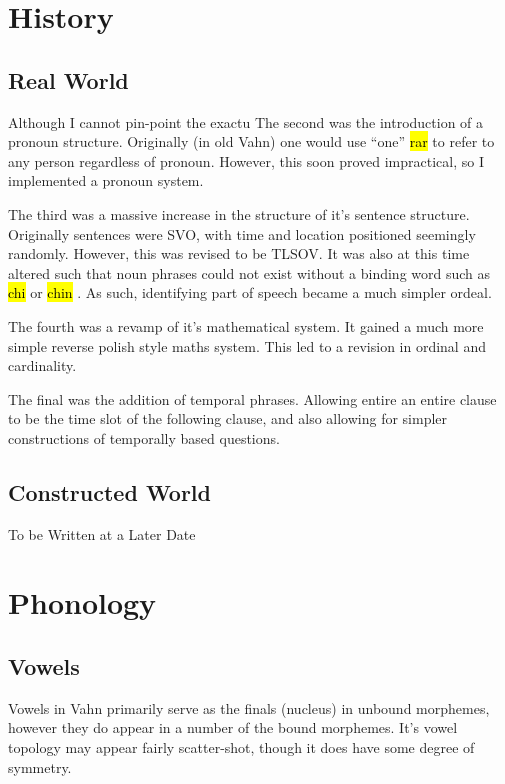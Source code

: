 \documentclass{article}
\newcommand{\hlv}[2][gray]{ {\sethlcolor{#1} \hl{#2}} }
\begin{document}
\newpage
\section{History}

\subsection{Real World}

Although I cannot pin-point the exactu
The second was the introduction of a pronoun structure. Originally (in old Vahn) one would use ``one'' \hlv{rar} to refer to any person regardless of pronoun. However, this soon proved impractical, so I implemented a pronoun system.

The third was a massive increase in the structure of it's sentence structure. Originally sentences were SVO, with time and location positioned seemingly randomly. However, this was revised to be TLSOV. It was also at this time altered such that noun phrases could not exist without a binding word such as \hlv{chi} or \hlv{chin}. As such, identifying part of speech became a much simpler ordeal.

The fourth was a revamp of it's mathematical system. It gained a much more simple reverse polish style maths system. This led to a revision in ordinal and cardinality.

The final was the addition of temporal phrases. Allowing entire an entire clause to be the time slot of the following clause, and also allowing for simpler constructions of temporally based questions.

\subsection{Constructed World}

To be Written at a Later Date

\newpage
\section{Phonology}

\subsection{Vowels}

Vowels in Vahn primarily serve as the finals (nucleus) in unbound morphemes, however they do appear in a number of the bound morphemes. It's vowel topology may appear fairly scatter-shot, though it does have some degree of symmetry.
\end{document}
